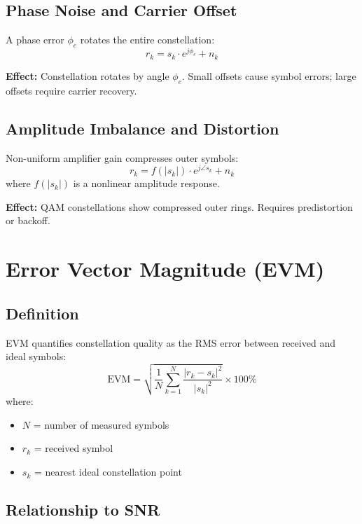 \subsection{Phase Noise and Carrier Offset}

A phase error $\phi_e$ rotates the entire constellation:
\begin{equation}
r_k = s_k \cdot e^{j\phi_e} + n_k
\end{equation}

\textbf{Effect:} Constellation rotates by angle $\phi_e$. Small offsets cause symbol errors; large offsets require carrier recovery.

\subsection{Amplitude Imbalance and Distortion}

Non-uniform amplifier gain compresses outer symbols:
\begin{equation}
r_k = f(|s_k|) \cdot e^{j\angle s_k} + n_k
\end{equation}
where $f(|s_k|)$ is a nonlinear amplitude response.

\textbf{Effect:} QAM constellations show compressed outer rings. Requires predistortion or backoff.

\section{Error Vector Magnitude (EVM)}

\subsection{Definition}

EVM quantifies constellation quality as the RMS error between received and ideal symbols:
\begin{equation}
\mathrm{EVM} = \sqrt{\frac{1}{N}\sum_{k=1}^{N}\frac{|r_k - s_k|^2}{|s_k|^2}} \times 100\%
\end{equation}
where:
\begin{itemize}
\item $N$ = number of measured symbols
\item $r_k$ = received symbol
\item $s_k$ = nearest ideal constellation point
\end{itemize}

\subsection{Relationship to SNR}

